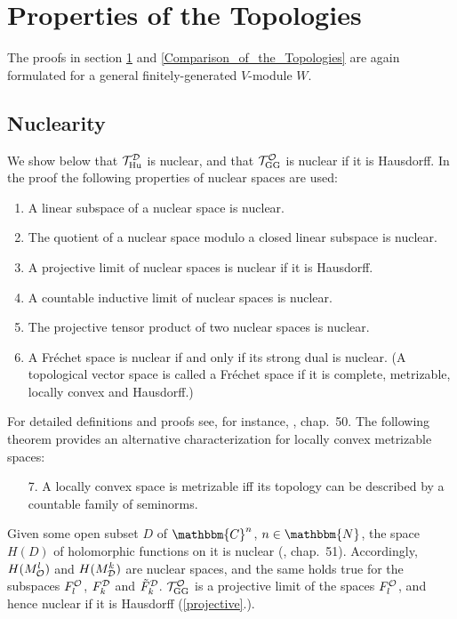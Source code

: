 \documentclass[a4paper,12pt,twoside]{article}
\renewcommand{\c}[1]{{\cal #1}}
\newcommand{\bN}{\mathbbm{N}}
\newcommand{\bC}{\mathbbm{C}}
\newcommand{\cT}{{\cal T}}
\newcommand{\pt}[1]{\ref{#1}.}
\renewcommand{\O}{\c{O}}
\newcommand{\D}{\c{D}}
\newcommand{\Hu}{{\rm Hu}}
\newcommand{\GG}{{\rm GG}}
\newcommand{\THud}{\cT_{\Hu}^{\D}}
\newcommand{\TGG}{\cT_{\GG}^{\O}}
\newcommand{\Fd}{F^{\D}_k}
\newcommand{\Fo}{F^{\O}_l}
\newcommand{\hF}{\tilde{F}}
\newcommand{\hFd}{\hF^{\D}_k}
\newcommand{\Md}{M^k_{\D}}
\newcommand{\Mo}{M^l_{\O}}
\begin{document}
\section{Properties of the Topologies}
\label{Properties_of_the_Topologies}
The proofs in section \ref{Properties_of_the_Topologies} and
\ref{Comparison_of_the_Topologies}
are again formulated for a general finitely-generated $V$-module $W$.

\subsection{Nuclearity}
\label{Nuclearity}
We show below that $\THud$ is nuclear, and that $\TGG$ is nuclear if it is
Hausdorff.
In the proof the following properties of nuclear spaces are used:
\begin{enumerate}
\item A linear subspace of a nuclear space is nuclear.
\item \label{quotient}The quotient of a nuclear space modulo a closed linear subspace is
nuclear.
\item\label{projective} A projective limit of nuclear spaces is
nuclear if it is Hausdorff.
\item A countable inductive limit of nuclear spaces is
nuclear.\label{inductive}
\item The projective tensor product of two nuclear
spaces is  nuclear. \label{tensorproduct}
\item A Fr\'{e}chet space is nuclear if and only if its strong
dual is nuclear. \label{Frechetdual}
(A topological vector space is called a Fr\'{e}chet space if
it is complete, metrizable, locally convex and Hausdorff.)
\end{enumerate}
For detailed definitions and proofs see, for instance, \cite{Treves},
chap.\ 50. The following theorem provides an alternative characterization
for locally convex metrizable spaces:
\begin{enumerate}
\item[7.] A locally convex space is metrizable iff
its topology can be described by a countable family of seminorms.
\end{enumerate}

Given some open subset $D$ of $\bC^n$, $n\in\bN$,
the space $H(D)$ of holomorphic functions on it is nuclear (\cite{Treves}, chap.\ 51).
Accordingly, $H(\Mo)$ and $H(\Md)$ are nuclear spaces, and the same
holds true for the subspaces
$\Fo$, $\Fd$ and $\hFd$.
$\TGG$ is a projective limit of the spaces $\Fo$, and hence
nuclear if it is Hausdorff (\pt{projective}).
\end{document}
